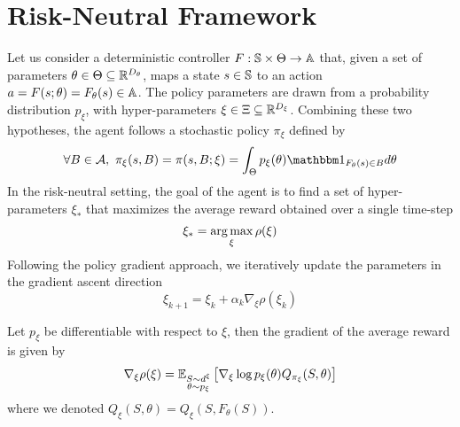 \section{Risk-Neutral Framework}
Let us consider a deterministic controller $F: \S \times
\Theta \to \A$ that, given a set of parameters $\theta \in \Theta \subseteq
\R^{D_\theta}$, maps a state $s \in \S$ to an action $a = F(s; \theta) =
F_\theta(s) \in \A$. The policy parameters are drawn from a probability distribution $p_\xi$, with hyper-parameters $\xi \in \Xi \subseteq \R^{D_\xi}$. Combining these two
hypotheses, the agent follows a stochastic policy $\pi_\xi$ defined by
\begin{equation}
	\forall B \in \calA ,\ \pi_\xi(s,B) = \pi(s, B; \xi) = \int_\Theta p_\xi(\theta) 
	\ind{F_{\theta}(s)\in B} d\theta
\end{equation}
In the risk-neutral setting, the goal of the agent is to find a set of hyper-parameters $\xi_*$ that maximizes the average reward obtained over a single time-step 
\begin{equation*}
	\xi_* = \argmax_\xi \rho(\xi)
\end{equation*}
Following the policy gradient approach, we iteratively update the parameters in the gradient ascent direction 
\begin{equation*}
	\xi_{k+1} = \xi_k + \alpha_k \nabla_\xi \rho(\xi_k)
\end{equation*}
\begin{theorem}
	Let $p_\xi$ be differentiable with respect to $\xi$, then the gradient of the average reward is given by
	\begin{equation}
		\nabla_\xi \rho(\xi) = \E[\substack{S \sim d^\xi\\\theta \sim p_\xi}]{\nabla_\xi \log p_\xi(\theta) Q_{\pi_\xi}(S, \theta)}
	\end{equation}
	where we denoted $Q_\xi(S, \theta) = Q_\xi(S, F_\theta(S))$.
\end{theorem}
